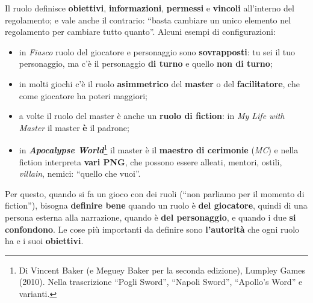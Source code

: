 Il ruolo definisce \textbf{obiettivi}, \textbf{informazioni}, \textbf{permessi} e
\textbf{vincoli} all'interno del regolamento; e vale anche il contrario: ``basta cambiare un unico
elemento nel regolamento per cambiare tutto quanto''. Alcuni esempi di configurazioni:
\begin{itemize}
  \item in \emph{Fiasco} ruolo del giocatore e personaggio sono \textbf{sovrapposti}: tu sei il
        tuo personaggio, ma c'è il personaggio \textbf{di turno} e quello \textbf{non di turno};
  \item in molti giochi c'è il ruolo \textbf{asimmetrico} del \textbf{master} o del
        \textbf{facilitatore}, che come giocatore ha poteri maggiori;
  \item a volte il ruolo del master è anche un \textbf{ruolo di fiction}: in \emph{My Life with
        Master} il master \textbf{è} il padrone;
  \item in \textbf{\emph{Apocalypse World}}\footnote{Di Vincent Baker (e Meguey Baker per la
        seconda edizione), Lumpley Games (2010). Nella trascrizione ``Pogli Sword'', ``Napoli
        Sword'', ``Apollo's Word'' e varianti.} il master è il \textbf{maestro di cerimonie}
        (\emph{MC}) e nella fiction interpreta \textbf{vari PNG}, che possono essere alleati,
        mentori, ostili, \emph{villain}, nemici: ``quello che vuoi''.
\end{itemize}
Per questo, quando si fa un gioco con dei ruoli (``non parliamo per il momento di fiction''),
bisogna \textbf{definire bene} quando un ruolo è \textbf{del giocatore}, quindi di una persona
esterna alla narrazione, quando è \textbf{del personaggio}, e quando i due \textbf{si
confondono}. Le cose più importanti da definire sono \textbf{l'autorità} che ogni ruolo ha e i
suoi \textbf{obiettivi}.

